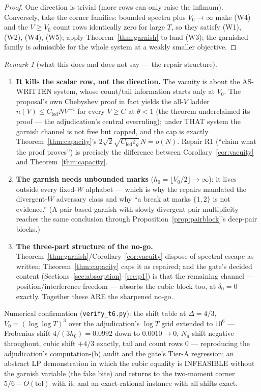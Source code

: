 \documentclass[11pt]{article}
\theoremstyle{plain}
\theoremstyle{definition}
\theoremstyle{remark}
\newtheorem{remark}[theorem]{Remark}
\newcommand{\Cled}{C_{\mathrm{led}}}
\newcommand{\Nd}{N_{d}}
\begin{document}
\begin{proof}
One direction is trivial (more rows can only raise the infimum). Conversely, take
the corner families: bounded spectra plus $V_0 \to \infty$ make (W4) and the
$V \ge V_0$ count rows identically zero for large $T$, so they satisfy (W1),
(W2), (W4), (W5); apply Theorem~\ref{thm:garnish} to land (W3); the garnished
family is admissible for the whole system at a weakly smaller objective.
\end{proof}

\begin{remark}[what this does and does not say --- the repair structure]
\label{rem:repairstructure}
\begin{enumerate}
\item \textbf{It kills the scalar row, not the direction.} The vacuity is about
  the AS-WRITTEN system, whose count/tail information starts only at $V_0$. The
  proposal's own Chebyshev proof in fact yields the all-$V$ ladder
  $n(V) \le \Cled N V^{-4}$ for every $V \ge C$ at $\theta < 1$ (the theorem
  underclaimed its proof --- the adjudication's central overruling); under THAT
  system the garnish channel is not free but capped, and the cap is exactly
  Theorem~\ref{thm:capacity}'s $2\sqrt{2}\sqrt{\Cled \varepsilon_g}\, N = o(N)$.
  Repair R1 (``claim what the proof proves'') is precisely the difference between
  Corollary~\ref{cor:vacuity} and Theorem~\ref{thm:capacity}.
\item \textbf{The garnish needs unbounded marks}
  ($h_0 = \lfloor V_0/2 \rfloor \to \infty$): it lives outside every fixed-$W$
  alphabet --- which is why the repairs mandated the divergent-$W$ adversary
  class and why ``a break at marks $\{1, 2\}$ is not evidence.'' (A pair-based
  garnish with slowly divergent pair multiplicity reaches the same conclusion
  through Proposition~\ref{prop:pairblock}'s deep-pair blocks.)
\item \textbf{The three-part structure of the no-go.}
  Theorem~\ref{thm:garnish}/Corollary~\ref{cor:vacuity} dispose of spectral
  escape as written; Theorem~\ref{thm:capacity} caps it as repaired; and the
  gate's decided content (Sections~\ref{sec:absorption}--\ref{sec:p1}) is that
  the remaining channel --- position/interference freedom --- absorbs the cubic
  block too, at $\delta_0 = 0$ exactly. Together these ARE the sharpened no-go.
\end{enumerate}
\end{remark}

Numerical confirmation (\texttt{verify\_t6.py}): the shift table at
$\Delta = 4/3$, $V_0 = (\log\log T)^3$ over the adjudication's $\log T$ grid
extended to $10^6$ --- Frobenius shift $4/(3 h_0) = 0.0992$ down to
$0.0010 \to 0$, $\Nd$ shift negative throughout, cubic shift $+4/3$ exactly, tail
and count rows $0$ --- reproducing the adjudication's computation-(b) audit and
the gate's Tier-A regression; an abstract LP demonstration in which the cubic
equality is INFEASIBLE without the garnish variable (the fake bite) and returns to
the two-moment corner $5/6 - O(\mathrm{tol})$ with it; and an exact-rational
instance with all shifts exact.
\end{document}
